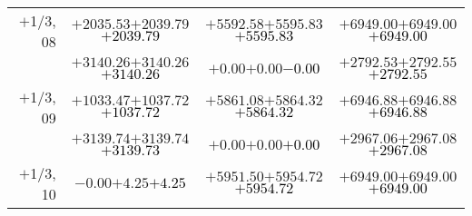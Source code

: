 \documentclass[compress]{beamer}
\begin{document}
\begin{frame}
{\begin{tabular}{r | c | c | c}
$+$1/3, 08 & $+2035.53$\hspace{0.1 cm}$+2039.79$\hspace{0.1 cm}\textcolor{black}{$+2039.79$} & $+5592.58$\hspace{0.1 cm}$+5595.83$\hspace{0.1 cm}\textcolor{black}{$+5595.83$} & $+6949.00$\hspace{0.1 cm}$+6949.00$\hspace{0.1 cm}\textcolor{black}{$+6949.00$} \\
           & $+3140.26$\hspace{0.1 cm}$+3140.26$\hspace{0.1 cm}\textcolor{black}{$+3140.26$} & $+0.00$\hspace{0.1 cm}$+0.00$\hspace{0.1 cm}\textcolor{black}{$-0.00$} & $+2792.53$\hspace{0.1 cm}$+2792.55$\hspace{0.1 cm}\textcolor{black}{$+2792.55$} \\
$+$1/3, 09 & $+1033.47$\hspace{0.1 cm}$+1037.72$\hspace{0.1 cm}\textcolor{black}{$+1037.72$} & $+5861.08$\hspace{0.1 cm}$+5864.32$\hspace{0.1 cm}\textcolor{black}{$+5864.32$} & $+6946.88$\hspace{0.1 cm}$+6946.88$\hspace{0.1 cm}\textcolor{black}{$+6946.88$} \\
           & $+3139.74$\hspace{0.1 cm}$+3139.74$\hspace{0.1 cm}\textcolor{black}{$+3139.73$} & $+0.00$\hspace{0.1 cm}$+0.00$\hspace{0.1 cm}\textcolor{black}{$+0.00$} & $+2967.06$\hspace{0.1 cm}$+2967.08$\hspace{0.1 cm}\textcolor{black}{$+2967.08$} \\
$+$1/3, 10 & $-0.00$\hspace{0.1 cm}$+4.25$\hspace{0.1 cm}\textcolor{black}{$+4.25$} & $+5951.50$\hspace{0.1 cm}$+5954.72$\hspace{0.1 cm}\textcolor{black}{$+5954.72$} & $+6949.00$\hspace{0.1 cm}$+6949.00$\hspace{0.1 cm}\textcolor{black}{$+6949.00$} \\

\end{tabular}}
\end{frame}
\end{document}
